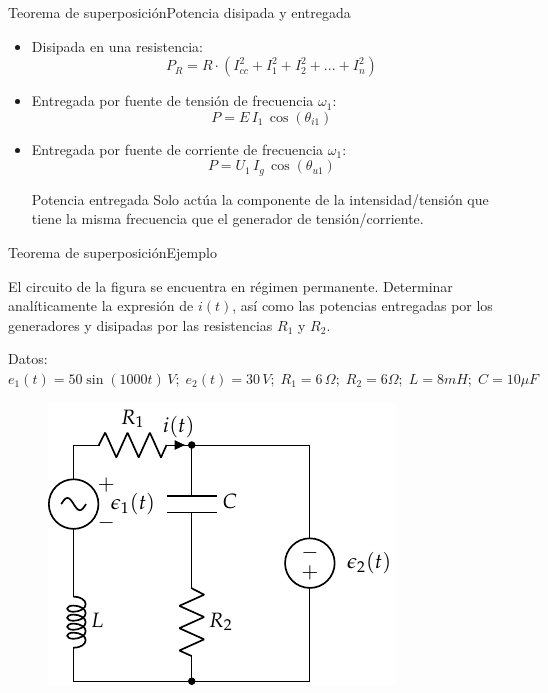 \documentclass[aspectratio=169, xcolor={usenames,svgnames,dvipsnames}]{beamer}
\begin{document}
\begin{frame}
{Teorema de superposición}{Potencia disipada y entregada}
\begin{itemize}
\item Disipada en una resistencia:
\begin{equation*}
    {P_R=R\cdot\left(I_{cc}^2+I_1^2+I_2^2+...+I_n^2 \right)}
\end{equation*}
\item Entregada por fuente de tensión de frecuencia $\omega_1$: 
\begin{equation*}
    {P=E\,I_1\,\cos(\theta_{i1})}
\end{equation*}
\item Entregada por fuente de corriente de frecuencia $\omega_1$: 
\begin{equation*}
    {P=U_1\,I_{g}\,\cos(\theta_{u1})}
\end{equation*}
\begin{block}{Potencia entregada}
Solo actúa la componente de la intensidad/tensión que tiene \alert{la misma frecuencia} que el generador de tensión/corriente.
\end{block}
\end{itemize}
\end{frame}

\begin{frame}{Teorema de superposición}{Ejemplo}

El circuito de la figura se encuentra en régimen permanente. Determinar
analíticamente la expresión de $i(t)$, así como las potencias entregadas por los
generadores y disipadas por las resistencias $R_1$ y $R_2$.

Datos: $e_1(t) = {50 \sin(1000 t)}\,V;\; e_2(t) = {30}\,V;\; R_1 = 6\,\Omega;\; R_2 = {6}{\Omega};\; L = {8}{mH};\; C = {10}{\mu F}$

\begin{figure}[H]
    \centering
    \includegraphics{../figs/superposicion1.pdf}
\end{figure}
    
\end{frame}
\end{document}
